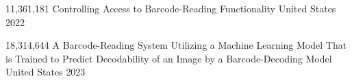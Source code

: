 



\begin{cvhonors}


\cvhonor
{11,361,181} %
{Controlling Access to Barcode-Reading Functionality} %
{United States} %
{2022} %


\cvhonor
{18,314,644} %
{A Barcode-Reading System Utilizing a Machine Learning Model That is Trained to Predict Decodability of an Image by a Barcode-Decoding Model} %
{United States} %
{2023} %


\end{cvhonors}